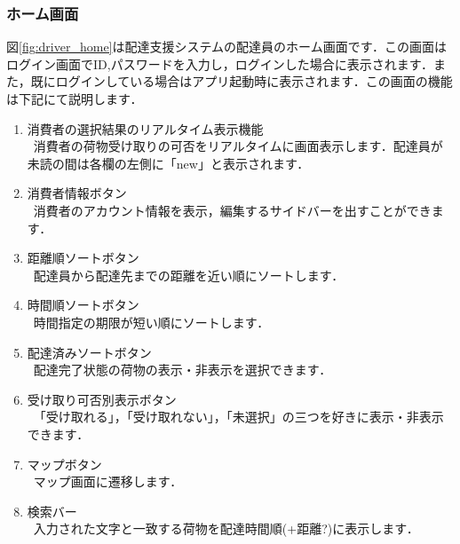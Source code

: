 \documentclass[a4j,titlepage]{jarticle}
\begin{document}
\subsubsection{ホーム画面}
図\ref{fig:driver_home}は配達支援システムの配達員のホーム画面です．この画面はログイン画面でID,パスワードを入力し，ログインした場合に表示されます．また，既にログインしている場合はアプリ起動時に表示されます．この画面の機能は下記にて説明します．
\begin{enumerate}
	\item 消費者の選択結果のリアルタイム表示機能\\
	 \ 消費者の荷物受け取りの可否をリアルタイムに画面表示します．配達員が未読の間は各欄の左側に「new」と表示されます．
	\item 消費者情報ボタン\\
	 \ 消費者のアカウント情報を表示，編集するサイドバーを出すことができます．
	\item 距離順ソートボタン\\
	 \ 配達員から配達先までの距離を近い順にソートします．
	\item 時間順ソートボタン\\
   \ 時間指定の期限が短い順にソートします．
	\item 配達済みソートボタン\\
   \ 配達完了状態の荷物の表示・非表示を選択できます．
	\item 受け取り可否別表示ボタン\\
	 \ 「受け取れる」，「受け取れない」，「未選択」の三つを好きに表示・非表示できます．
	\item マップボタン\\
   \ マップ画面に遷移します．
	\item 検索バー\\
	 \ 入力された文字と一致する荷物を配達時間順(+距離?)に表示します．
\end{enumerate}
\end{document}
